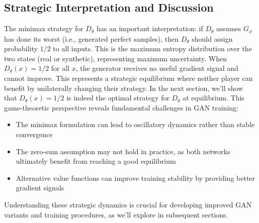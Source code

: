 \subsection{Strategic Interpretation and Discussion}
The minimax strategy for $D_\theta$ has an important interpretation: if $D_\theta$ assumes $G_\phi$ has done its worst (i.e., generated perfect samples), then $D_\theta$ should assign probability $1/2$ to all inputs. This is the maximum entropy distribution over the two states (real or synthetic), representing maximum uncertainty.
When $D_\theta(x) = 1/2$ for all $x$, the generator receives no useful gradient signal and cannot improve. This represents a strategic equilibrium where neither player can benefit by unilaterally changing their strategy. In the next section, we'll show that $D_\theta(x) = 1/2$ is indeed the optimal strategy for $D_\theta$ at equilibrium.
This game-theoretic perspective reveals fundamental challenges in GAN training:
\begin{itemize}
	\item The minimax formulation can lead to oscillatory dynamics rather than stable convergence
	\item The zero-sum assumption may not hold in practice, as both networks ultimately benefit from reaching a good equilibrium
	\item Alternative value functions can improve training stability by providing better gradient signals
\end{itemize}
Understanding these strategic dynamics is crucial for developing improved GAN variants and training procedures, as we'll explore in subsequent sections.
